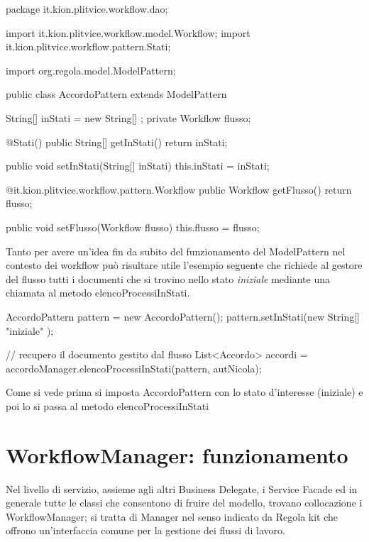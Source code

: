 \begin{java}

package it.kion.plitvice.workflow.dao;

import it.kion.plitvice.workflow.model.Workflow;
import it.kion.plitvice.workflow.pattern.Stati;

import org.regola.model.ModelPattern;

public class AccordoPattern extends ModelPattern {

  String[] inStati = new String[] {};
  private Workflow flusso;

  @Stati()
  public String[] getInStati() {
    return inStati;
  }

  public void setInStati(String[] inStati) {
    this.inStati = inStati;
  }
  
  @it.kion.plitvice.workflow.pattern.Workflow
  public Workflow getFlusso() {
    return flusso;
  }

  public void setFlusso(Workflow flusso) {
    this.flusso = flusso;
  }
  
}
\end{java}

Tanto per avere un'idea fin da subito del funzionamento del ModelPattern nel contesto dei workflow può risultare utile l'esempio seguente che richiede al gestore del flusso tutti i documenti che si trovino nello stato \textit{iniziale} mediante una chiamata al metodo elencoProcessiInStati. 

\begin{java}
AccordoPattern pattern = new AccordoPattern();
pattern.setInStati(new String[] { "iniziale" });
    
// recupero il documento gestito dal flusso
List<Accordo> accordi = 
 accordoManager.elencoProcessiInStati(pattern, autNicola);
\end{java}


Come si vede prima si imposta AccordoPattern con lo stato d'interesse (iniziale) e poi lo si passa al metodo elencoProcessiInStati


\section{WorkflowManager: funzionamento}
Nel livello di servizio, assieme agli altri Business Delegate, i Service Facade ed in generale tutte le classi che consentono di fruire del modello, trovano collocazione i WorkflowManager; si tratta di Manager nel senso indicato da Regola kit che offrono un'interfaccia comune per la gestione dei flussi di lavoro. 

